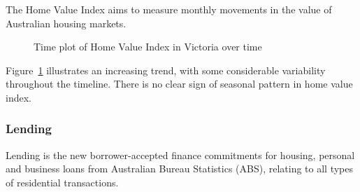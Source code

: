\documentclass[
  11pt,
  a4paper,
]{article}
\begin{document}
The Home Value Index aims to measure monthly movements in the value of
Australian housing markets.

\begin{figure}


\caption{\label{fig-hvitrend}Time plot of Home Value Index in Victoria
over time}

\end{figure}%

Figure~\ref{fig-hvitrend} illustrates an increasing trend, with some
considerable variability throughout the timeline. There is no clear sign
of seasonal pattern in home value index.

\subsubsection{Lending}\label{lending}

Lending is the new borrower-accepted finance commitments for housing,
personal and business loans from Australian Bureau Statistics (ABS),
relating to all types of residential transactions.
\end{document}
